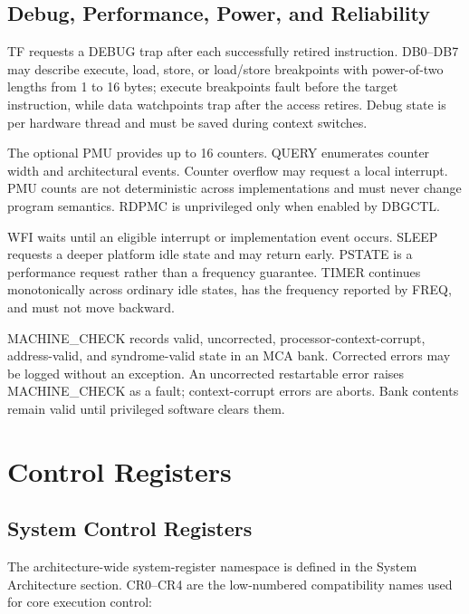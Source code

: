 \documentclass[11pt]{article}
\begin{document}
\subsection{Debug, Performance, Power, and Reliability}

TF requests a DEBUG trap after each successfully retired instruction. DB0--DB7 may describe execute, load, store, or load/store breakpoints with power-of-two lengths from 1 to 16 bytes; execute breakpoints fault before the target instruction, while data watchpoints trap after the access retires. Debug state is per hardware thread and must be saved during context switches.

The optional PMU provides up to 16 counters. QUERY enumerates counter width and architectural events. Counter overflow may request a local interrupt. PMU counts are not deterministic across implementations and must never change program semantics. RDPMC is unprivileged only when enabled by DBGCTL.

WFI waits until an eligible interrupt or implementation event occurs. SLEEP requests a deeper platform idle state and may return early. PSTATE is a performance request rather than a frequency guarantee. TIMER continues monotonically across ordinary idle states, has the frequency reported by FREQ, and must not move backward.

MACHINE\_CHECK records valid, uncorrected, processor-context-corrupt, address-valid, and syndrome-valid state in an MCA bank. Corrected errors may be logged without an exception. An uncorrected restartable error raises MACHINE\_CHECK as a fault; context-corrupt errors are aborts. Bank contents remain valid until privileged software clears them.

\section{Control Registers}

\subsection{System Control Registers}

The architecture-wide system-register namespace is defined in the System Architecture section. CR0--CR4 are the low-numbered compatibility names used for core execution control:
\end{document}
